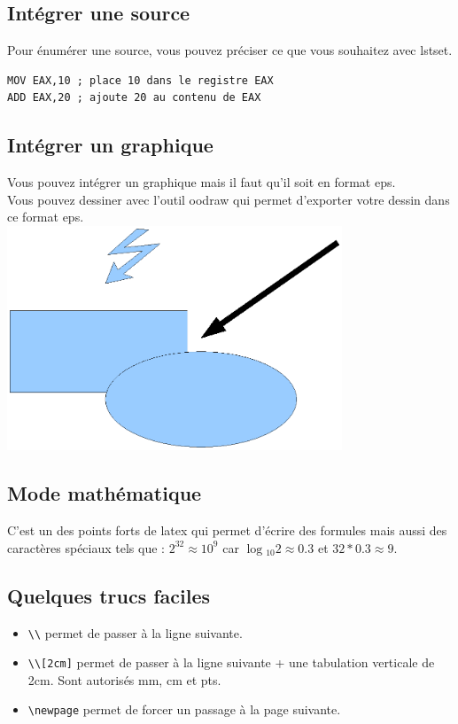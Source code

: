 \subsection {Intégrer une source}
Pour énumérer une source, vous pouvez préciser ce que vous souhaitez avec lstset. 
\lstset{language=c,frame=trBL}
\begin{lstlisting}
MOV EAX,10 ; place 10 dans le registre EAX
ADD EAX,20 ; ajoute 20 au contenu de EAX
\end{lstlisting}
\subsection {Intégrer un graphique}
Vous pouvez intégrer un graphique mais il faut qu'il soit en format eps.\\
Vous pouvez dessiner avec l'outil oodraw qui permet d'exporter votre dessin dans ce format eps.\\
\includegraphics[width=10cm]{Dessin.eps}
\subsection {Mode mathématique}
C'est un des points forts de latex qui permet d'écrire des formules mais aussi des caractères spéciaux tels que :
$2^{32} \approx 10^{9}$ car $\log{_{10}}{2} \approx 0.3$ et $32*0.3 \approx 9$.
\subsection {Quelques trucs faciles}
\begin{itemize}
\item \verb+\\+ permet de passer à la ligne suivante.
\item \verb+\\[2cm]+ permet de passer à la ligne suivante + une tabulation verticale de 2cm. Sont autorisés mm, cm et pts.
\item \verb+\newpage+ permet de forcer un passage à la page suivante.
\end{itemize}
